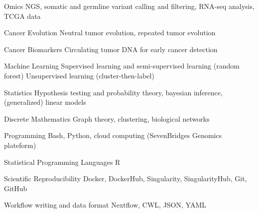 

\begin{cvskills}


  \cvskill
    {Omics} %
    {NGS, somatic and germline variant calling and filtering, RNA-seq analysis, TCGA data} %

  \cvskill
    {Cancer Evolution} %
    {Neutral tumor evolution, repeated tumor evolution} %

  \cvskill
    {Cancer Biomarkers} %
    {Circulating tumor DNA for early cancer detection} %

  \cvskill
    {Machine Learning} %
    {Supervised learning and semi-supervised learning (random forest) \newline Unsupervised learning (cluster-then-label)} %

  \cvskill
    {Statistics} %
    {Hypothesis testing and probability theory, bayesian
inference, (generalized) linear models} %

  \cvskill
    {Discrete Mathematics} %
    {Graph theory, clustering, biological networks} %
    
  \cvskill
    {Programming} %
    {Bash, Python, cloud computing (SevenBridges Genomics plateform)} %

  \cvskill
    {Statistical Programming Languages} %
    {R} %

  \cvskill
    {Scientific Reproducibility} %
    {Docker, DockerHub, Singularity, SingularityHub, Git, GitHub} %

  \cvskill
    {Workflow writing and data format} %
    {Nextflow, CWL, JSON, YAML} %


\end{cvskills}
